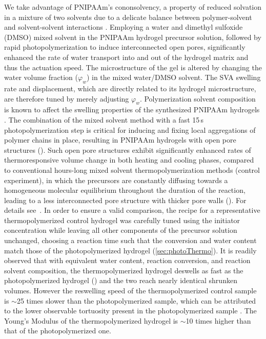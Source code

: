 We take advantage of PNIPAAm's cononsolvency, a property of reduced solvation in a mixture of two solvents due to a delicate balance between polymer-solvent and solvent-solvent interactions \cite{Pica2016}. Employing a water and dimethyl sulfoxide (DMSO) mixed solvent in the PNIPAAm hydrogel precursor solution, followed by rapid photopolymerization to induce interconnected open pores, significantly enhanced the rate of water transport into and out of the hydrogel matrix and thus the actuation speed. The microstructure of the gel is altered by changing the water volume fraction (\(\varphi_{w}\)) in the mixed water/DMSO solvent. The SVA swelling rate and displacement, which are directly related to its hydrogel microstructure, are therefore tuned by merely  adjusting \(\varphi_{w}\). Polymerization solvent composition is known to affect the swelling properties of the synthesized PNIPAAm hydrogels . 
The combination of the mixed solvent method with a fast 15\,s photopolymerization step is critical for inducing and fixing local aggregations of polymer chains in place,
resulting in PNIPAAm hydrogels with open pore structures (). Such open pore structures exhibit significantly enhanced rates of thermoresponsive volume change in both heating and cooling phases, compared to conventional hours-long mixed solvent thermopolymerization methods (control experiment), in which the precursors are constantly diffusing towards a homogeneous molecular equilibrium throughout the duration of the reaction, leading to a less interconnected pore structure with thicker pore walls (). For details see~\cite{Alsaid2021}.
In order to ensure a valid comparison, the recipe for a representative thermopolymerized control hydrogel was carefully tuned using the initiator concentration while leaving all other components of the precursor solution unchanged, choosing a reaction time such that the conversion and water content match those of the photopolymerized hydrogel (\ref{sec:photoThermo}). It is readily observed that with equivalent water content, reaction conversion, and reaction solvent composition, the thermopolymerized hydrogel deswells as fast as the photopolymerized hydrogel () and the two reach nearly identical shrunken volumes. However the reswelling speed of the thermopolymerized control sample is $\sim$25 times slower than the photopolymerized sample, which can be attributed to the lower observable tortuosity present in the photopolymerized sample . The Young's Modulus of the thermopolymerized hydrogel is $\sim$10 times higher than that of the photopolymerized one. \\

